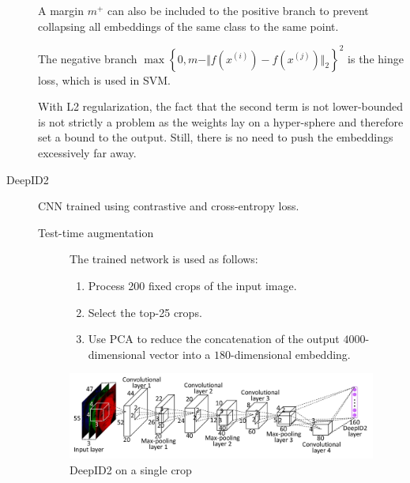 \begin{description}
            \begin{remark}
                A margin $m^+$ can also be included to the positive branch to prevent collapsing all embeddings of the same class to the same point.
            \end{remark}

            \begin{remark}
                The negative branch $\max\left\{0, m - \Vert f(x^{(i)}) - f(x^{(j)}) \Vert_2\right\}^2$ is the hinge loss, which is used in SVM.
            \end{remark}

            \begin{remark}
                With L2 regularization, the fact that the second term is not lower-bounded is not strictly a problem as the weights lay on a hyper-sphere and therefore set a bound to the output. Still, there is no need to push the embeddings excessively far away.
            \end{remark}

    \item[DeepID2] 
            CNN trained using contrastive and cross-entropy loss.

            \begin{description}
                \item[Test-time augmentation]
                    The trained network is used as follows:
                    \begin{enumerate}
                        \item Process 200 fixed crops of the input image.
                        \item Select the top-25 crops.
                        \item Use PCA to reduce the concatenation of the output $4000$-dimensional vector into a $180$-dimensional embedding.
                    \end{enumerate}
            \end{description}

            \begin{figure}[H]
                \centering
                \includegraphics[width=0.7\linewidth]{./img/deepid2.jpg}
                \caption{DeepID2 on a single crop}
            \end{figure}
\end{description}

